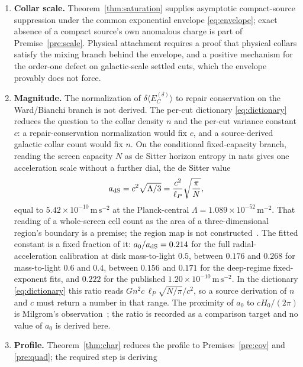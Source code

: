 \documentclass[11pt]{article}
\begin{document}
\begin{enumerate}
\item \textbf{Collar scale.} Theorem~\ref{thm:saturation} supplies
asymptotic compact-source suppression under the common exponential
envelope \eqref{eq:envelope}; exact absence of a compact source's own
anomalous charge is part of Premise~\ref{pre:scale}. Physical attachment
requires a proof that physical collars satisfy the mixing branch behind
the envelope, and a positive mechanism for the order-one defect on
galactic-scale settled cuts, which the envelope provably does not force.
\item \textbf{Magnitude.} The normalization of
\(\delta\langle E_C^{(\delta)}\rangle\) to repair conservation on the
Ward/Bianchi branch is not derived. The per-cut dictionary
\eqref{eq:dictionary} reduces the question to the collar density \(n\) and
the per-cut variance constant \(c\): a repair-conservation normalization
would fix \(c\), and a source-derived galactic collar count would fix \(n\).
On the conditional fixed-capacity branch, reading the screen capacity \(N\)
as de Sitter horizon entropy in nats gives one acceleration scale without a
further dial, the de Sitter value
\begin{equation}
a_{\rm dS}=c^2\sqrt{\Lambda/3}=\frac{c^2}{\ell_P}\sqrt{\frac{\pi}{N}},
\label{eq:horizon-scale}
\end{equation}
equal to \(5.42\times10^{-10}\,\mathrm{m\,s^{-2}}\) at the Planck-central
\(\Lambda=1.089\times10^{-52}\,\mathrm{m^{-2}}\). That reading of a
whole-screen cell count as the area of a three-dimensional region's boundary
is a premise; the region map is not constructed~\cite{ophentropy}. The fitted constant is a
fixed fraction of it: \(a_0/a_{\rm dS}=0.214\) for the full
radial-acceleration calibration at disk mass-to-light \(0.5\), between
\(0.176\) and \(0.268\) for mass-to-light \(0.6\) and \(0.4\), between
\(0.156\) and \(0.171\) for the deep-regime fixed-exponent fits, and
\(0.222\) for the published \(1.20\times10^{-10}\,\mathrm{m\,s^{-2}}\). In
the dictionary \eqref{eq:dictionary} this ratio reads
\(Gn^2c\,\ell_P\sqrt{N/\pi}/c^2\), so a source derivation of \(n\) and \(c\)
must return a number in that range. The proximity of \(a_0\) to
\(cH_0/(2\pi)\) is Milgrom's observation~\cite{milgrom1983}; the ratio is
recorded as a comparison target and no value of \(a_0\) is derived here.
\item \textbf{Profile.} Theorem~\ref{thm:char} reduces the profile to
Premises~\ref{pre:cov} and \ref{pre:quad}; the required step is deriving

\end{enumerate}
\end{document}
